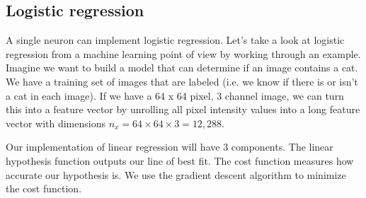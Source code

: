 \subsection{Logistic regression}
A single neuron can implement logistic regression. Let's take a look at logistic regression from a machine learning point of view by working through an example. 
Imagine we want to build a model that can determine if an image contains a cat. We have a training set of images that are labeled (i.e. we know if there is or isn't a cat in each image). If we have a 64 x 64 pixel, 3 channel image, we can turn this into a feature vector by unrolling all pixel intensity values into a long feature vector with dimensions $n_{x} = 64 \times 64 \times 3 = 12,288$.


Our implementation of linear regression will have 3 components. The linear hypothesis function outputs our line of best fit. The cost function measures how accurate our hypothesis is. We use the gradient descent algorithm to minimize the cost function. 

